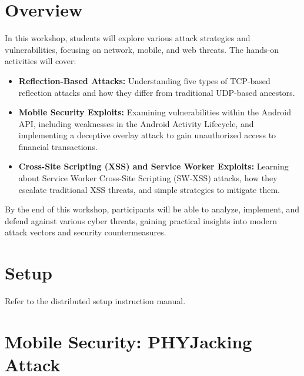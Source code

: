 \documentclass[letterpaper,12pt]{report}
\newcounter{taskset}
\newcounter{action}[taskset]
\begin{document}
\clearpage
{}
\settableofcontents
\tableofcontents
\clearpage

\newpage

\section*{Overview}\label{sec:work-carried-out-2}

In this workshop, students will explore various attack strategies and vulnerabilities, focusing on network, mobile, and web threats. The hands-on activities will cover:

\begin{itemize}
    \item \textbf{Reflection-Based Attacks:} Understanding five types of TCP-based reflection attacks and how they differ from traditional UDP-based ancestors.
    \item \textbf{Mobile Security Exploits:} Examining vulnerabilities within the Android API, including weaknesses in the Android Activity Lifecycle, and implementing a deceptive overlay attack to gain unauthorized access to financial transactions.
    \item \textbf{Cross-Site Scripting (XSS) and Service Worker Exploits:} Learning about Service Worker Cross-Site Scripting (SW-XSS) attacks, how they escalate traditional XSS threats, and simple strategies to mitigate them.
\end{itemize}

By the end of this workshop, participants will be able to analyze, implement, and defend against various cyber threats, gaining practical insights into modern attack vectors and security countermeasures.


\section*{Setup}\label{sec:Setup}

Refer to the distributed setup instruction manual.

\section*{Mobile Security: PHYJacking Attack}
\end{document}

